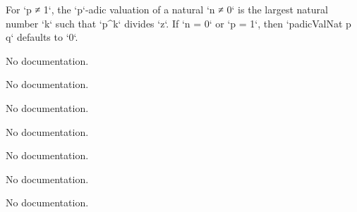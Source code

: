 \begin{definition}\label{padicValNat'}
        \leanok
                For `p ≠ 1`, the `p`-adic valuation of a natural `n ≠ 0` is the largest natural number `k` such
that `p^k` divides `z`. If `n = 0` or `p = 1`, then `padicValNat p q` defaults to `0`.
    \end{definition}

\begin{theorem}\label{finite_ideal_iff}
                No documentation.
    \end{theorem}

\begin{theorem}\label{ord_top}
                No documentation.
    \end{theorem}

\begin{definition}\label{Valuation.leIdeal}
                No documentation.
    \end{definition}

\begin{theorem}\label{Valuation.leIdeal_eq_top}
                No documentation.
    \end{theorem}

\begin{definition}\label{Valuation.ltIdeal}
                No documentation.
    \end{definition}

\begin{theorem}\label{Valuation.ltIdeal_eq_top}
                No documentation.
    \end{theorem}

\begin{theorem}\label{DiscreteValuation.leIdeal_eq_ltIdeal_add_one}
                No documentation.
    \end{theorem}

